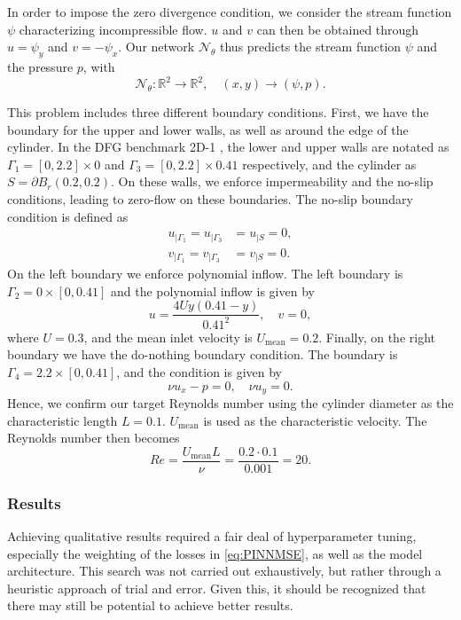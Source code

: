 In order to impose the zero divergence condition, we consider the stream function $\psi$ characterizing incompressible flow. $u$ and $v$ can then be obtained through $u=\psi_y$ and $v=-\psi_x$. Our network $\mathcal{N}_\theta$ thus predicts the stream function $\psi$ and the pressure $p$, with
\begin{equation}
    \mathcal{N}_\theta : \mathbb{R}^2 \to \mathbb{R}^2, \quad (x,y)\to (\psi, p).
\end{equation}


This problem includes three different boundary conditions.
First, we have the boundary for the upper and lower walls, as well as around the edge of the cylinder.
In the DFG benchmark 2D-1 \cite{DFG}, the lower and upper walls are notated as $\Gamma_1 = [0,2.2]\times 0$ and $\Gamma_3 = [0,2.2]\times 0.41$ respectively, and the cylinder as $S=\partial B_r(0.2,0.2)$.
On these walls, we enforce impermeability and the no-slip conditions, leading to zero-flow on these boundaries. 
The no-slip boundary condition is defined as
\begin{equation}
\begin{split}
    u_{|\Gamma_1} = u_{|\Gamma_3} &= u_{|S} = 0, \\
    v_{|\Gamma_1} = v_{|\Gamma_3} &= v_{|S} = 0.
\end{split}
\end{equation}
On the left boundary we enforce polynomial inflow.
The left boundary is $\Gamma_2 = 0\times [0,0.41]$ and the polynomial inflow is given by
\begin{equation}
    u=\frac{4Uy(0.41-y)}{0.41^2}, \quad v=0,
\end{equation}
where $U=0.3$, and the mean inlet velocity  is $U_{\text{mean}} = 0.2$.
Finally, on the right boundary we have the do-nothing boundary condition.
The boundary is $\Gamma_4=2.2\times[0,0.41]$, and the condition is given by
\begin{equation}
    \nu u_x - p = 0, \quad \nu u_y = 0.
\end{equation}
Hence, we confirm our target Reynolds number using the cylinder diameter as the characteristic length $L=0.1$.
$U_{\text{mean}}$ is used as the characteristic velocity.
The Reynolds number then becomes
\begin{equation}
    Re = \frac {U_{\text{mean}} L} \nu = \frac {0.2 \cdot 0.1} {0.001} = 20.
\end{equation}

\subsubsection{Results}
Achieving qualitative results required a fair deal of hyperparameter tuning, especially the weighting of the losses in \eqref{eq:PINNMSE}, as well as the model architecture.
This search was not carried out exhaustively, but rather through a heuristic approach of trial and error.
Given this, it should be recognized that there may still be potential to achieve better results.

